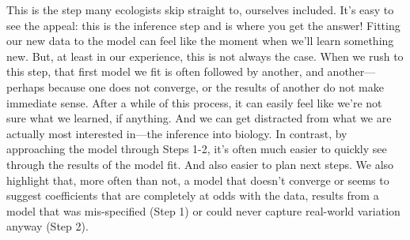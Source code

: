 \documentclass[11pt]{article}
\begin{document}
{This is the step many ecologists skip straight to, ourselves included. It's easy to see the appeal: this is the inference step and is where you get the answer! Fitting our new data to the model can feel like the moment when we'll learn something new. But, at least in our experience, this is not always the case. When we rush to this step, that first model we fit is often followed by another, and another---perhaps because one does not converge, or the results of another do not make immediate sense. After a while of this process, it can easily feel like we're not sure what we learned, if anything. And we can get distracted from what we are actually most interested in---the inference into biology. In contrast, by approaching the model through Steps 1-2, it's often much easier to quickly see through the results of the model fit. And also easier to plan next steps. We also highlight that, more often than not, a model that doesn't converge or seems to suggest coefficients that are completely at odds with the data, results from a model that was mis-specified (Step 1) or could never capture real-world variation anyway (Step 2).
 

}
\end{document}
